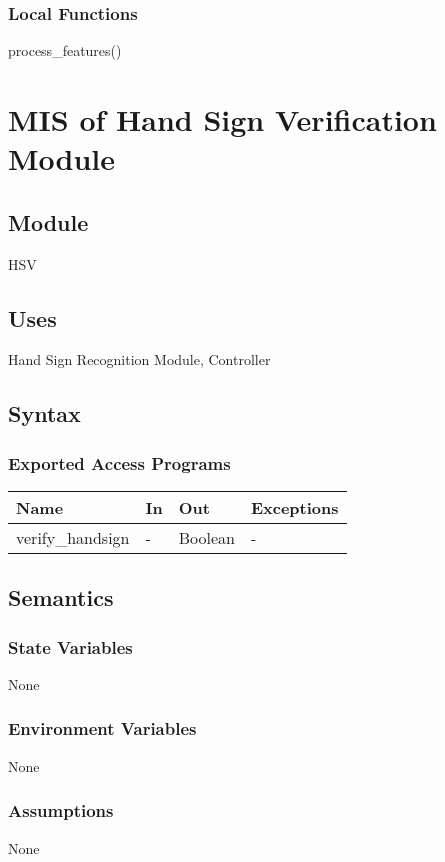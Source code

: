 \documentclass[12pt, titlepage]{article}
\begin{document}
\subsubsection{Local Functions}
process\_features()

\section{MIS of Hand Sign Verification Module} \label{Module} 
\subsection{Module}
HSV
\subsection{Uses}
Hand Sign Recognition Module, Controller
\subsection{Syntax}
\subsubsection{Exported Access Programs}
\begin{center}
\begin{tabular}{p{4cm} p{4cm} p{4cm} p{2cm}}
\hline
\textbf{Name} & \textbf{In} & \textbf{Out} & \textbf{Exceptions} \\
\hline
verify\_handsign & - & Boolean & - \\
\hline
\end{tabular}
\end{center}
\subsection{Semantics}
\subsubsection{State Variables}
None
\subsubsection{Environment Variables}
None
\subsubsection{Assumptions}
None
\end{document}
